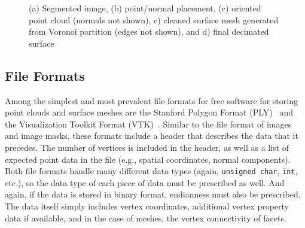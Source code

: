 \begin{figure}[ht!]
{\label{fig:shabakaseq4}}
%
\caption{(a) Segmented image, (b) point/normal placement, (c) oriented point cloud (normals not shown), c) cleaned surface mesh generated from Voronoi partition (edges not shown), and d) final decimated surface}
\label{fig:shabakaseq}
\end{figure}

\subsection{File Formats}
\label{File Formats-SURF}

Among the simplest and most prevalent file formats for free software for storing point clouds and surface meshes are the Stanford Polygon Format (PLY)~\cite{ply} and the Visualization Toolkit Format (VTK)~\cite{vtk}. Similar to the file format of images and image masks, these formats include a header that describes the data that it precedes. The number of vertices is included in the header, as well as a list of expected point data in the file (e.g., spatial coordinates, normal components). Both file formats handle many different data types (again, \texttt{unsigned char}, \texttt{int}, etc.), so the data type of each piece of data must be prescribed as well. And again, if the data is stored in binary format, endianness must also be prescribed. The data itself simply includes vertex coordinates, additional vertex property data if available, and in the case of meshes, the vertex connectivity of facets.

